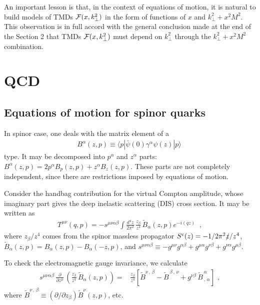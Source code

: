 \documentclass[final,5p,times,twocolumn]{elsarticle}
\begin{document}
An important  lesson is that, in the context of equations of motion, it is 
natural to build    models 
of TMDs  $  {\cal F} (x, k_\perp^2) $ in the form of  functions 
of  $x$ and $k_\perp^2+x^2 M^2 $.   
 This observation is in full accord with the general conclusion 
made at the end of  the Section 2 that TMDs 
$  {\cal F} (x, k_\perp^2) $ must depend on  $k_\perp^2 $ 
through the $k_\perp^2+x^2 M^2 $ combination. 

 \setcounter{equation}{0}  
 
\section{QCD}

\subsection{Equations of motion for spinor quarks}

In spinor case, one deals with the matrix element  of a 
    \begin{align}
 B^\alpha  (z,p) \equiv \langle  p | \bar \psi (0)\gamma^\alpha  \psi(z)  | p \rangle \  
\end{align}
type. 
It may be decomposed into $p^\alpha$ and $z^\alpha$ parts:
$B^\alpha  (z,p) = 2 p^\alpha B_p (z,p) + z^\alpha B_z (z,p)$.  
These parts are not completely  independent, since there are restrictions
imposed by  equations of motion. 

Consider the handbag contribution for the virtual Compton amplitude,
whose imaginary part gives the  deep inelastic scattering (DIS) cross section. It may be written as 
    \begin{align}
 T^{\mu \nu} (q,p) = -s^{\mu\nu \alpha \beta} 
\int \frac{d^4z}{2\pi^2 } \, \frac{z_\beta}{z^4} \,\tilde B_\alpha (z,p)   e^{-i(qz)} \, \, 
 \  , 
\label{Tpqzpsi}
\end{align}
where $z_\beta/z^4$  comes from   the spinor massless propagator
 \mbox{$S^c (z) = -1/2\pi^2 \slashed z /z^4$,}  $\tilde B_\alpha (z,p)= B_\alpha (z,p)-B_\alpha (-z,p)$, and  
$s^{\mu\nu \alpha \beta} \equiv -g^{\mu\nu} g^{ \alpha \beta} + g^{\mu\alpha} g^{\nu \beta} 
+ g^{\nu\alpha} g^{\mu \beta} $. 
 
 To check the electromagnetic gauge invariance, we calculate
    \begin{align}
s^{\mu\nu \alpha \beta} \, \frac{\partial}{\partial z^\mu} \,\left (
 \frac{z_\beta}{z^4} \,\tilde B_\alpha (z,p)  \right ) =&   \frac{z_\beta}{z^4} \left [
   \tilde B^{\nu \, ,\, \beta}
-\tilde B^{\, \beta\, ,\, \nu} + g^{\nu\beta} \,\tilde B^{\, \alpha}_{\, ,\, \alpha} \right ]
 \, \,  , 
 \label{EMch}
\end{align}
 where $ \tilde B^{\nu \, ,\, \beta}  \equiv (\partial /\partial z_\beta) \tilde B^\nu (z,p)$, etc.
 
\end{document}

